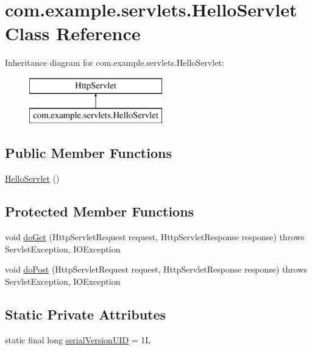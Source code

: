\hypertarget{classcom_1_1example_1_1servlets_1_1_hello_servlet}{}\section{com.\+example.\+servlets.\+Hello\+Servlet Class Reference}
\label{classcom_1_1example_1_1servlets_1_1_hello_servlet}
Inheritance diagram for com.\+example.\+servlets.\+Hello\+Servlet\+:\begin{figure}[H]
\begin{center}
\leavevmode
\includegraphics[height=2.000000cm]{classcom_1_1example_1_1servlets_1_1_hello_servlet}
\end{center}
\end{figure}
\subsection*{Public Member Functions}
\begin{DoxyCompactItemize}
\item 
\hyperlink{classcom_1_1example_1_1servlets_1_1_hello_servlet_acde0125d36d0d4cbbe7ed5d5ccc93c54}{Hello\+Servlet} ()
\end{DoxyCompactItemize}
\subsection*{Protected Member Functions}
\begin{DoxyCompactItemize}
\item 
void \hyperlink{classcom_1_1example_1_1servlets_1_1_hello_servlet_aebf5d769bdf4e1181b45c870ee9d9c49}{do\+Get} (Http\+Servlet\+Request request, Http\+Servlet\+Response response)  throws Servlet\+Exception, I\+O\+Exception 
\item 
void \hyperlink{classcom_1_1example_1_1servlets_1_1_hello_servlet_add7f3c9daaaccbe81fe119dd8ae99ae4}{do\+Post} (Http\+Servlet\+Request request, Http\+Servlet\+Response response)  throws Servlet\+Exception, I\+O\+Exception 
\end{DoxyCompactItemize}
\subsection*{Static Private Attributes}
\begin{DoxyCompactItemize}
\item 
static final long \hyperlink{classcom_1_1example_1_1servlets_1_1_hello_servlet_aee3a8f698be2149a6d0c401ab648cf82}{serial\+Version\+U\+I\+D} = 1\+L
\end{DoxyCompactItemize}



